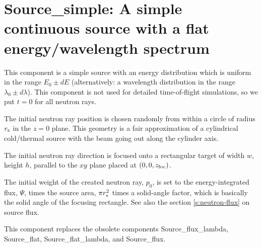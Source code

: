 \section{Source\_simple: A simple continuous source
with a flat energy/wavelength spectrum}
\label{source-simple}


This component is
a simple source with an energy distribution which is uniform
in the range $E_0 \pm dE$
(alternatively: a wavelength distribution in the range $\lambda_0 \pm d\lambda$).
This component is not used for detailed time-of-flight simulations,
so we put $t=0$ for all neutron rays.

The initial neutron ray position is chosen randomly from within a
circle of radius $r_{\rm s}$ in the $z=0$ plane.
This geometry is a fair approximation
of a cylindrical cold/thermal source with the beam going out along
the cylinder axis.

The initial neutron ray direction is focused onto a rectangular target of width
$w$, height $h$, parallel to the $xy$ plane placed at $(0,0,z_{\rm foc})$.

The initial weight of the created neutron ray, $p_0$, is set to the
energy-integrated flux, $\Psi$, times the source area, $\pi r_{\rm s}^2$
times a solid-angle factor, which is basically the
solid angle of the focusing rectangle.
See also the section \ref{s:neutron-flux} on source flux.

This component replaces the obsolete components
Source\_flux\_lambda, Source\_flat, Source\_flat\_lambda, and Source\_flux.
